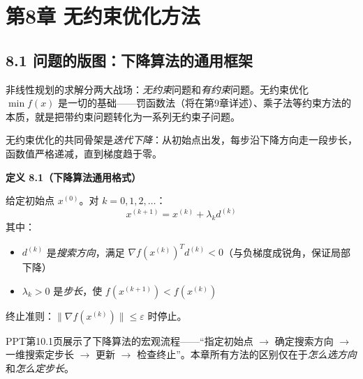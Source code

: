 \section{第8章 \quad 无约束优化方法}

\subsection{8.1 问题的版图：下降算法的通用框架}

非线性规划的求解分两大战场：\emph{无约束}问题和\emph{有约束}问题。无约束优化 $\min f(x)$ 是一切的基础——罚函数法（将在第9章详述）、乘子法等约束方法的本质，就是把带约束问题转化为一系列无约束子问题。

无约束优化的共同骨架是\emph{迭代下降}：从初始点出发，每步沿下降方向走一段步长，函数值严格递减，直到梯度趋于零。

\begin{defbox}
\textbf{定义 8.1（下降算法通用格式）}

给定初始点 $x^{(0)}$。对 $k = 0,1,2,\dots$：
\[
x^{(k+1)} = x^{(k)} + \lambda_k d^{(k)}
\]
其中：
\begin{itemize}
  \item $d^{(k)}$ 是\emph{搜索方向}，满足 $\nabla f(x^{(k)})^T d^{(k)} < 0$（与负梯度成锐角，保证局部下降）
  \item $\lambda_k > 0$ 是\emph{步长}，使 $f(x^{(k+1)}) < f(x^{(k)})$
\end{itemize}
终止准则：$\|\nabla f(x^{(k)})\| \le \varepsilon$ 时停止。
\end{defbox}


PPT第10.1页展示了下降算法的宏观流程——``指定初始点 $\to$ 确定搜索方向 $\to$ 一维搜索定步长 $\to$ 更新 $\to$ 检查终止''。本章所有方法的区别仅在于\emph{怎么选方向}和\emph{怎么定步长}。

